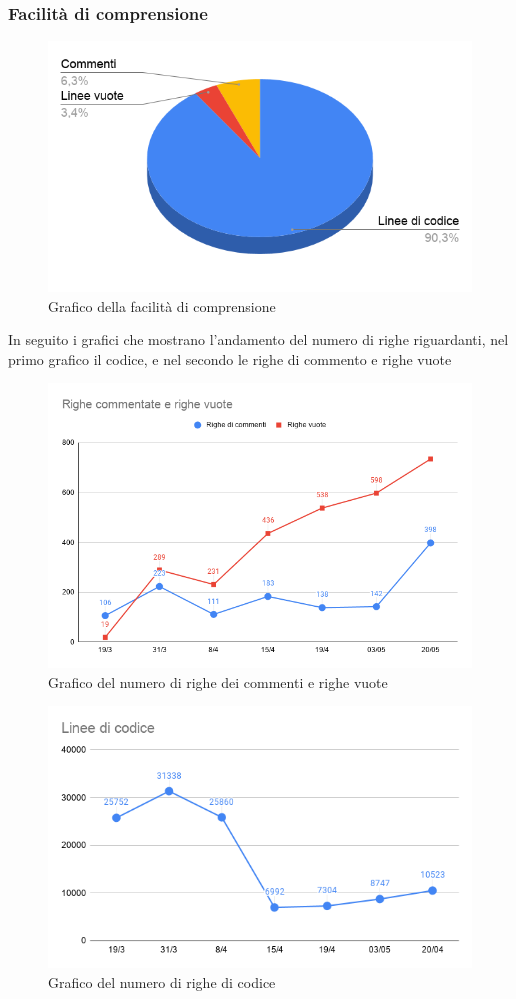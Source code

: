     \subsubsection{Facilità di comprensione}

        \begin{figure}[H]
            \centering
            \includegraphics[width=10 cm]{source/sections/images/facilitaDelCodice.png}
            \caption{Grafico della facilità di comprensione}
        \end{figure}

    In seguito i grafici che mostrano l'andamento del numero di righe riguardanti, nel primo grafico il codice, e nel secondo le righe di commento e righe vuote

    \begin{figure}[H]
        \centering
        \includegraphics[width=10 cm]{source/sections/images/Valori-delle-righe.png}
        \caption{Grafico del numero di righe dei commenti e righe vuote}
    \end{figure}

    \begin{figure}[H]
        \centering
        \includegraphics[width=10 cm]{source/sections/images/numCodice.png}
        \caption{Grafico del numero di righe di codice}
    \end{figure}

